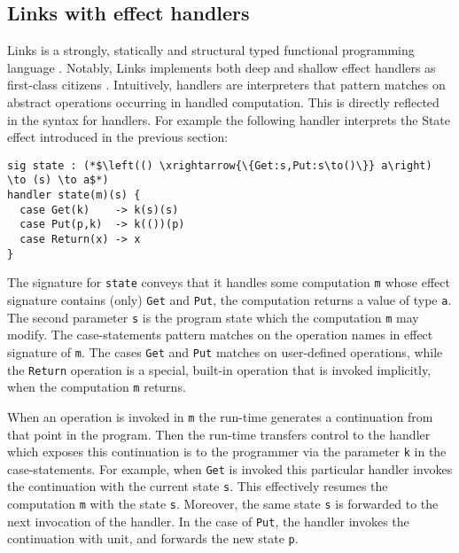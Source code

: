 \documentclass[preprint,10pt,numbers]{sigplanconf}
\begin{document}


  \subsection{Links with effect handlers}\label{sec:effect-links}
  Links is a strongly, statically and structural typed functional programming language \cite{Cooper2006}. Notably, Links implements both deep and shallow effect handlers as first-class citizens \cite{Hillerstrom2015}. Intuitively, handlers are interpreters that pattern matches on abstract operations occurring in handled computation. This is directly reflected in the syntax for handlers. For example the following handler interprets the State effect introduced in the previous section:
\begin{lstlisting}[style=links,caption={}]
sig state : (*$\left(() \xrightarrow{\{Get:s,Put:s\to()\}} a\right) \to (s) \to a$*)
handler state(m)(s) {
  case Get(k)    -> k(s)(s)
  case Put(p,k)  -> k(())(p)
  case Return(x) -> x
}
\end{lstlisting}
The signature for \texttt{state} conveys that it handles some computation \texttt{m} whose effect signature contains (only) \texttt{Get} and \texttt{Put}, the computation returns a value of type \texttt{a}. The second parameter \texttt{s} is the program state which the computation \texttt{m} may modify.
The case-statements pattern matches on the operation names in effect signature of \texttt{m}.
The cases \texttt{Get} and \texttt{Put} matches on user-defined operations, while the \texttt{Return} operation is a special, built-in operation that is invoked implicitly, when the computation \texttt{m} returns.

When an operation is invoked in \texttt{m} the run-time generates a continuation from that point in the program. Then the run-time transfers control to the handler which exposes this continuation is to the programmer via the parameter \texttt{k} in the case-statements. For example, when \texttt{Get} is invoked this particular handler invokes the continuation with the current state \texttt{s}. This effectively resumes the computation \texttt{m} with the state \texttt{s}. Moreover, the same state \texttt{s} is forwarded to the next invocation of the handler. In the case of \texttt{Put}, the handler invokes the continuation with unit, and forwards the new state \texttt{p}.
\end{document}

